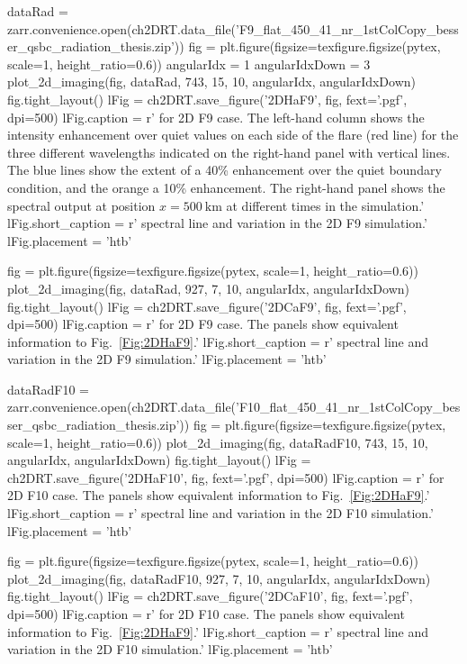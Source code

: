 \begin{pycode}[2DRT]
dataRad = zarr.convenience.open(ch2DRT.data_file('F9_flat_450_41_nr_1stColCopy_besser_qsbc_radiation_thesis.zip'))
fig = plt.figure(figsize=texfigure.figsize(pytex, scale=1, height_ratio=0.6))
angularIdx = 1
angularIdxDown = 3
plot_2d_imaging(fig, dataRad, 743, 15, 10, angularIdx, angularIdxDown)
fig.tight_layout()
lFig = ch2DRT.save_figure('2DHaF9', fig, fext='.pgf', dpi=500)
lFig.caption = r'\Ha{} for 2D F9 case. The left-hand column shows the intensity enhancement over quiet values on each side of the flare (red line) for the three different wavelengths indicated on the right-hand panel with vertical lines. The blue lines show the extent of a 40\% enhancement over the quiet boundary condition, and the orange a 10\% enhancement. The right-hand panel shows the spectral output at position $x=\SI{500}{\kilo\metre}$ at different times in the simulation.'
lFig.short_caption = r'\Ha{} spectral line and variation in the 2D F9 simulation.'
lFig.placement = 'htb'
\end{pycode}

\begin{pycode}[2DRT]
fig = plt.figure(figsize=texfigure.figsize(pytex, scale=1, height_ratio=0.6))
plot_2d_imaging(fig, dataRad, 927, 7, 10, angularIdx, angularIdxDown)
fig.tight_layout()
lFig = ch2DRT.save_figure('2DCaF9', fig, fext='.pgf', dpi=500)
lFig.caption = r'\CaLine{} for 2D F9 case. The panels show equivalent information to Fig.~\ref{Fig:2DHaF9}.'
lFig.short_caption = r'\CaLine{} spectral line and variation in the 2D F9 simulation.'
lFig.placement = 'htb'
\end{pycode}

\begin{pycode}[2DRT]
dataRadF10 = zarr.convenience.open(ch2DRT.data_file('F10_flat_450_41_nr_1stColCopy_besser_qsbc_radiation_thesis.zip'))
fig = plt.figure(figsize=texfigure.figsize(pytex, scale=1, height_ratio=0.6))
plot_2d_imaging(fig, dataRadF10, 743, 15, 10, angularIdx, angularIdxDown)
fig.tight_layout()
lFig = ch2DRT.save_figure('2DHaF10', fig, fext='.pgf', dpi=500)
lFig.caption = r'\Ha{} for 2D F10 case. The panels show equivalent information to Fig.~\ref{Fig:2DHaF9}.'
lFig.short_caption = r'\Ha{} spectral line and variation in the 2D F10 simulation.'
lFig.placement = 'htb'
\end{pycode}


\begin{pycode}[2DRT]
fig = plt.figure(figsize=texfigure.figsize(pytex, scale=1, height_ratio=0.6))
plot_2d_imaging(fig, dataRadF10, 927, 7, 10, angularIdx, angularIdxDown)
fig.tight_layout()
lFig = ch2DRT.save_figure('2DCaF10', fig, fext='.pgf', dpi=500)
lFig.caption = r'\CaLine{} for 2D F10 case. The panels show equivalent information to Fig.~\ref{Fig:2DHaF9}.'
lFig.short_caption = r'\CaLine{} spectral line and variation in the 2D F10 simulation.'
lFig.placement = 'htb'
\end{pycode}

